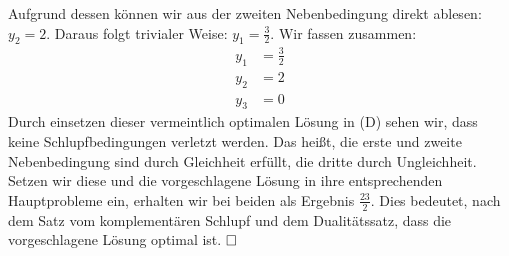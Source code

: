 \documentclass [a4paper,11pt]{article}
\begin{document}
\begin{enumerate}
\begin{enumerate}
                    Aufgrund dessen können wir aus der zweiten Nebenbedingung direkt ablesen: $y_2 = 2$. Daraus folgt trivialer Weise: $y_1 = \frac{3}{2}$.
                    Wir fassen zusammen:
                    \begin{align*}
                    y_1 &= \frac{3}{2}\\
                    y_2 &= 2\\
                    y_3 &= 0
                    \end{align*}
                    Durch einsetzen dieser vermeintlich optimalen Lösung in (D) sehen wir, dass keine Schlupfbedingungen verletzt werden. Das heißt, die
                    erste und zweite Nebenbedingung sind durch Gleichheit erfüllt, die dritte durch Ungleichheit. Setzen wir diese und die vorgeschlagene
                    Lösung in ihre entsprechenden Hauptprobleme ein, erhalten wir bei beiden als Ergebnis $\frac{23}{2}$. Dies bedeutet, nach dem Satz vom
                    komplementären Schlupf und dem Dualitätssatz, dass die vorgeschlagene Lösung optimal ist. $\qed$

            \end{enumerate}


\end{enumerate}
\end{document}

